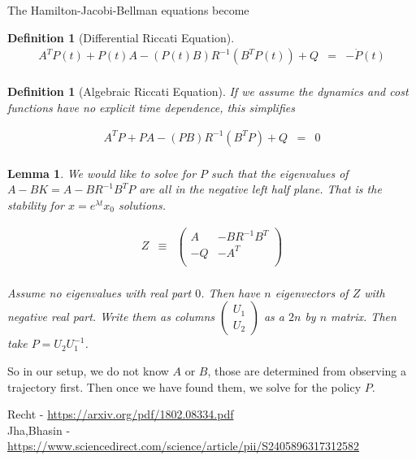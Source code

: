 \documentclass[a4paper,landscape]{article}
\theoremstyle{change}
\newtheorem{definition}[equation]{Definition}
\newtheorem{lemma}[equation]{Lemma}
\theoremstyle{nonumberplain}
\numberwithin{equation}{section}
\begin{document}
The Hamilton-Jacobi-Bellman equations become

\begin{definition}[Differential Riccati Equation]
\begin{eqnarray*}
A^T P(t) + P(t) A - ( P(t) B ) R^{-1} ( B^T P(t) ) + Q &=& - \dot{P} (t)\\
\end{eqnarray*}
\end{definition}

\begin{definition}[Algebraic Riccati Equation]

If we assume the dynamics and cost functions have no explicit time dependence, this simplifies

\begin{eqnarray*}
A^T P + P A - ( P B ) R^{-1} ( B^T P ) + Q &=& 0\\
\end{eqnarray*}
\end{definition}

\begin{lemma}

We would like to solve for $P$ such that the eigenvalues of $A-BK=A-BR^{-1} B^T P$ are all in the negative left half plane. That is the stability for $x = e^{\lambda t} x_0$ solutions.

\begin{eqnarray*}
Z &\equiv& \begin{pmatrix}
A & -BR^{-1}B^T\\
-Q & -A^T\\
\end{pmatrix}\\
\end{eqnarray*}

Assume no eigenvalues with real part $0$. Then have $n$ eigenvectors of $Z$ with negative real part. Write them as columns $\begin{pmatrix}U_1\\U_2\end{pmatrix}$ as a $2n$ by $n$ matrix. Then take $P=U_2 U_1^{-1}$.

\end{lemma}

So in our setup, we do not know $A$ or $B$, those are determined from observing a trajectory first. Then once we have found them, we solve for the policy $P$.

Recht - \url{https://arxiv.org/pdf/1802.08334.pdf}\\
Jha,Bhasin - \url{https://www.sciencedirect.com/science/article/pii/S2405896317312582}
\end{document}
